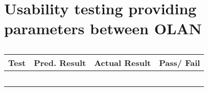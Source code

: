 \section{Usability testing providing parameters between OLAN}
\begin{table}[h]
\begin{tabular}{|p{4.5cm}|p{3.5cm}|p{3.5cm}|l|}
\hline
\textbf{Test} & \textbf{Pred. Result} & \textbf{Actual Result} & \textbf{Pass/ Fail}                                                                                                    \\ \hline
    &    &            &     \\ \hline
    &    &            &     \\ \hline
    &    &            &     \\ \hline
    &    &            &     \\ \hline
    &    &            &     \\ \hline
\end{tabular}
\label{test:parameters}
\caption{}
\end{table}
